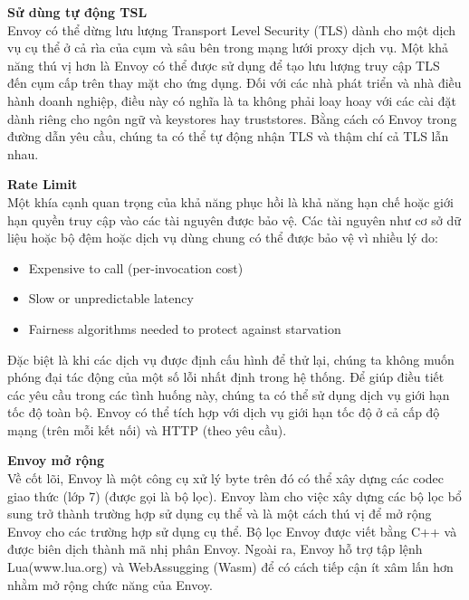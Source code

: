 \documentclass[12pt,a4paper]{report}
\begin{document}
		\textbf{Sử dùng tự động TSL}\\
		Envoy có thể dừng lưu lượng Transport Level Security (TLS) dành cho một dịch vụ cụ thể ở cả rìa của cụm và sâu bên trong mạng lưới proxy dịch vụ. Một khả năng thú vị hơn là Envoy có thể được sử dụng để tạo lưu lượng truy cập TLS đến cụm cấp trên thay mặt cho ứng dụng. Đối với các nhà phát triển và nhà điều hành doanh nghiệp, điều này có nghĩa là ta không phải loay hoay với các cài đặt dành riêng cho ngôn ngữ và keystores hay truststores. Bằng cách có Envoy trong đường dẫn yêu cầu, chúng ta có thể tự động nhận TLS và thậm chí cả TLS lẫn nhau.
		
		\textbf{Rate Limit}\\
		Một khía cạnh quan trọng của khả năng phục hồi là khả năng hạn chế hoặc giới hạn quyền truy cập vào các tài nguyên được bảo vệ. Các tài nguyên như cơ sở dữ liệu hoặc bộ đệm hoặc dịch vụ dùng chung có thể được bảo vệ vì nhiều lý do:
		\begin{itemize}
			\item Expensive to call (per-invocation cost)
			\item Slow or unpredictable latency
			\item Fairness algorithms needed to protect against starvation
		\end{itemize}
		
		Đặc biệt là khi các dịch vụ được định cấu hình để thử lại, chúng ta không muốn phóng đại tác động của một số lỗi nhất định trong hệ thống. Để giúp điều tiết các yêu cầu trong các tình huống này, chúng ta có thể sử dụng dịch vụ giới hạn tốc độ toàn bộ. Envoy có thể tích hợp với dịch vụ giới hạn tốc độ ở cả cấp độ mạng (trên mỗi kết nối) và HTTP (theo yêu cầu).
		
		\textbf{Envoy mở rộng}\\
		Về cốt lõi, Envoy là một công cụ xử lý byte trên đó có thể xây dựng các codec giao thức (lớp 7) (được gọi là bộ lọc). Envoy làm cho việc xây dựng các bộ lọc bổ sung trở thành trường hợp sử dụng cụ thể và là một cách thú vị để mở rộng Envoy cho các trường hợp sử dụng cụ thể. Bộ lọc Envoy được viết bằng C++ và được biên dịch thành mã nhị phân Envoy. Ngoài ra, Envoy hỗ trợ tập lệnh Lua(www.lua.org) và WebAssugging (Wasm) để có cách tiếp cận ít xâm lấn hơn nhằm mở rộng chức năng của Envoy.
		
\end{document}
